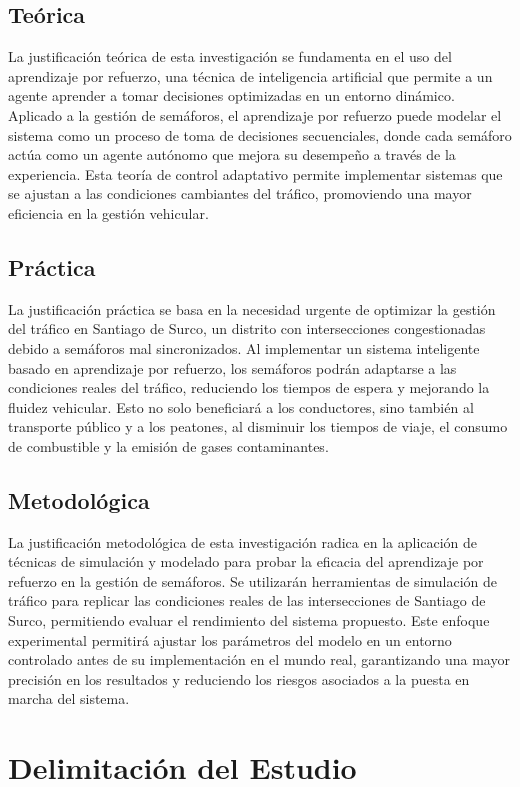 \subsection{Teórica}
La justificación teórica de esta investigación se fundamenta en el uso del aprendizaje por refuerzo, una técnica de inteligencia artificial que permite a un agente aprender a tomar decisiones optimizadas en un entorno dinámico. Aplicado a la gestión de semáforos, el aprendizaje por refuerzo puede modelar el sistema como un proceso de toma de decisiones secuenciales, donde cada semáforo actúa como un agente autónomo que mejora su desempeño a través de la experiencia. Esta teoría de control adaptativo permite implementar sistemas que se ajustan a las condiciones cambiantes del tráfico, promoviendo una mayor eficiencia en la gestión vehicular.

\subsection{Práctica}
La justificación práctica se basa en la necesidad urgente de optimizar la gestión del tráfico en Santiago de Surco, un distrito con intersecciones congestionadas debido a semáforos mal sincronizados. Al implementar un sistema inteligente basado en aprendizaje por refuerzo, los semáforos podrán adaptarse a las condiciones reales del tráfico, reduciendo los tiempos de espera y mejorando la fluidez vehicular. Esto no solo beneficiará a los conductores, sino también al transporte público y a los peatones, al disminuir los tiempos de viaje, el consumo de combustible y la emisión de gases contaminantes.

\subsection{Metodológica}
La justificación metodológica de esta investigación radica en la aplicación de técnicas de simulación y modelado para probar la eficacia del aprendizaje por refuerzo en la gestión de semáforos. Se utilizarán herramientas de simulación de tráfico para replicar las condiciones reales de las intersecciones de Santiago de Surco, permitiendo evaluar el rendimiento del sistema propuesto. Este enfoque experimental permitirá ajustar los parámetros del modelo en un entorno controlado antes de su implementación en el mundo real, garantizando una mayor precisión en los resultados y reduciendo los riesgos asociados a la puesta en marcha del sistema.
\section{Delimitación del Estudio}

